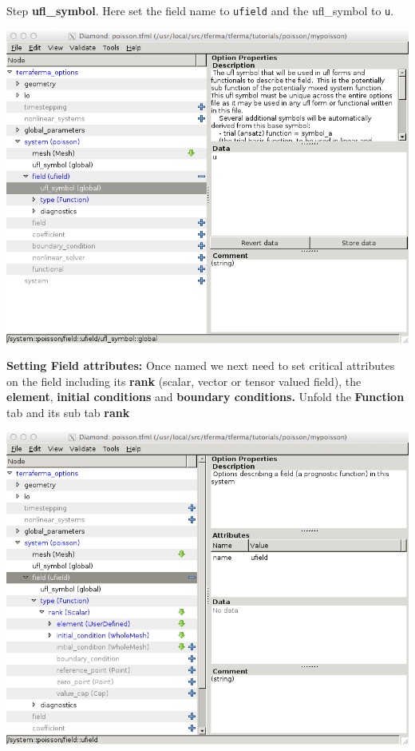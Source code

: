 \begin{steps}{Step}
\textbf{ufl\_symbol}.  Here set the field name to \texttt{ufield} and
the ufl\_symbol to \texttt{u}.
\begin{center}
    \includegraphics[width=\diamondwidth]{figures/screendumps/diamond_poisson_06c.png}
\end{center}
\item \textbf{Setting Field attributes:} Once named we next need to
  set critical attributes on the field including its \textbf{rank}
  (scalar, vector or tensor valued field), the \textbf{element},
  \textbf{initial conditions} and \textbf{boundary conditions.} Unfold
  the \textbf{Function} tab and its sub tab \textbf{rank}
\begin{center}
    \includegraphics[width=\diamondwidth]{figures/screendumps/diamond_poisson_07a.png}

\end{center}
\end{steps}
